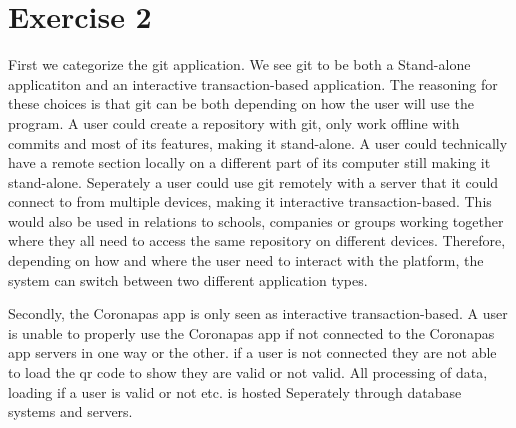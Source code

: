 \section{Exercise 2}
First we categorize the git application. We see git to be both a Stand-alone applicatiton and an interactive transaction-based application.
The reasoning for these choices is that git can be both depending on how the user will use the program.
A user could create a repository with git, only work offline with commits and most of its features, making it stand-alone. 
A user could technically have a remote section locally on a different part of its computer still making it stand-alone. 
Seperately a user could use git remotely with a server that it could connect to from multiple devices, making it interactive transaction-based.
This would also be used in relations to schools, companies or groups working together where they all need to access the same repository on different devices.
Therefore, depending on how and where the user need to interact with the platform, the system can switch between two different application types.

Secondly, the Coronapas app is only seen as interactive transaction-based.
A user is unable to properly use the Coronapas app if not connected to the Coronapas app servers in one way or the other.
if a user is not connected they are not able to load the qr code to show they are valid or not valid. 
All processing of data, loading if a user is valid or not etc. is hosted Seperately through database systems and servers.
